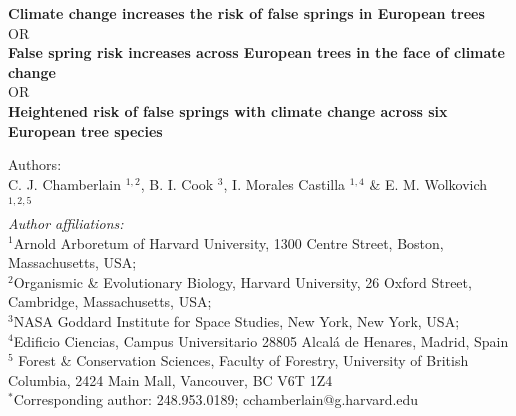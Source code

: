 \documentclass{article}\usepackage[]{graphicx}\usepackage[]{color}
\begin{document}
\noindent \textbf{\Large{Climate change increases the risk of false springs in European trees}} \\
OR \\
\textbf{\Large{False spring risk increases across European trees in the face of climate change}} \\
OR \\
\textbf{\Large{Heightened risk of false springs with climate change across six European tree species}}

\noindent Authors:\\
C. J. Chamberlain $^{1,2}$, B. I. Cook $^{3}$, I. Morales Castilla $^{1,4}$ \& E. M. Wolkovich $^{1,2,5}$
\vspace{2ex}\\
\emph{Author affiliations:}\\
$^{1}$Arnold Arboretum of Harvard University, 1300 Centre Street, Boston, Massachusetts, USA; \\
$^{2}$Organismic \& Evolutionary Biology, Harvard University, 26 Oxford Street, Cambridge, Massachusetts, USA; \\
$^{3}$NASA Goddard Institute for Space Studies, New York, New York, USA; \\
$^{4}$Edificio Ciencias, Campus Universitario 28805 Alcal\'{a} de Henares, Madrid, Spain \\
$^{5}$ Forest \& Conservation Sciences, Faculty of Forestry, University of British Columbia, 2424 Main Mall, Vancouver, BC V6T 1Z4\\
\vspace{2ex}
$^*$Corresponding author: 248.953.0189; cchamberlain@g.harvard.edu\\

\renewcommand{\thetable}{\arabic{table}}
\renewcommand{\thefigure}{\arabic{figure}}
\renewcommand{\labelitemi}{$-$}


\end{document}
